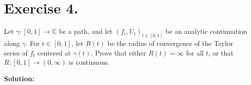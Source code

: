 \section*{Exercise 4.}

Let \(\gamma: [0, 1] \to \mathbb{C}\) be a path, and let \(( f_{t}, U_{t} )_{t \in [0, 1]}\) be an analytic continuation along \(\gamma\). For \(t \in [0, 1]\), let \(R(t)\) be the radius of convergence of the Taylor series of \(f_t\) centered at \(\gamma(t)\). Prove that either \(R(t) = \infty\) for all \(t\), or that \(R: [0, 1] \to (0, \infty)\) is continuous.

\textbf{Solution:}